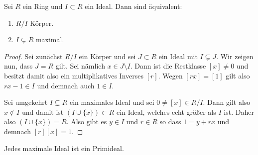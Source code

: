 \documentclass{book}
\begin{document}
\begin{prop}
    \label{prop:maximalfield}
    Sei $R$ ein Ring und $I \subset R$ ein Ideal. Dann sind äquivalent:
    \begin{enumerate}[label=(\roman *)]
        \item $R/I$ Körper.
        \item $I \subsetneq R$ maximal.
    \end{enumerate}
\end{prop}
\begin{proof}
    Sei zunächst $R/I$ ein Körper und sei $J \subset R$ ein Ideal mit $I
    \subsetneq J$. Wir zeigen nun, dass $J = R$ gilt. Sei nämlich $x \in J
    \setminus I$. Dann ist die Restklasse $[x] \neq 0$ und besitzt damit also
    ein multiplikatives Inverses $[r]$. Wegen $[rx] = [1]$ gilt also $rx - 1 \in
    I$ und demnach auch $1 \in I$. 

    Sei umgekehrt $I \subsetneq R$ ein maximales Ideal und sei $0 \neq [x] \in
    R/I$. Dann gilt also $x \notin I$ und damit ist $(I \cup \{x\}) \subset R$
    ein Ideal, welches echt größer als $I$ ist. Daher also $(I \cup \{x\}) = R$.
    Also gibt es $y \in I$ und $r \in R$ so dass $1 = y + rx$ und demnach
    $[r][x] = 1$.
\end{proof}

\begin{cor}
    \label{cor:maxprim}
    Jedes maximale Ideal ist ein Primideal.
\end{cor}
\end{document}
